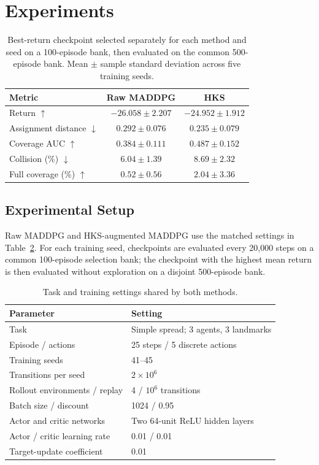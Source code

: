 \documentclass{article}
\begin{document}
\section{Experiments}
\begin{table}[t]
\centering
\caption{Best-return checkpoint selected separately for each method and seed on a 100-episode bank, then evaluated on the common 500-episode bank. Mean $\pm$ sample standard deviation across five training seeds.}
\label{tab:results}
\small\setlength{\tabcolsep}{4pt}
\begin{tabular}{lcc}
\toprule
Metric & Raw MADDPG & HKS \\
\midrule
Return $\uparrow$ & $-26.058 \pm 2.207$ & $-24.952 \pm 1.912$ \\
Assignment distance $\downarrow$ & $0.292 \pm 0.076$ & $0.235 \pm 0.079$ \\
Coverage AUC $\uparrow$ & $0.384 \pm 0.111$ & $0.487 \pm 0.152$ \\
Collision (\%) $\downarrow$ & $6.04 \pm 1.39$ & $8.69 \pm 2.32$ \\
Full coverage (\%) $\uparrow$ & $0.52 \pm 0.56$ & $2.04 \pm 3.36$ \\
\bottomrule
\end{tabular}
\end{table}
\subsection{Experimental Setup}
Raw MADDPG and HKS-augmented MADDPG use the matched settings in Table~\ref{tab:setup}. For each training seed, checkpoints are evaluated every 20,000 steps on a common 100-episode selection bank; the checkpoint with the highest mean return is then evaluated without exploration on a disjoint 500-episode bank.

\begin{table}[t]
\centering
\caption{Task and training settings shared by both methods.}
\label{tab:setup}
\footnotesize\setlength{\tabcolsep}{4pt}
\begin{tabular}{ll}
\toprule
Parameter & Setting \\
\midrule
Task & Simple spread; 3 agents, 3 landmarks \\
Episode / actions & 25 steps / 5 discrete actions \\
Training seeds & 41--45 \\
Transitions per seed & $2\times10^6$ \\
Rollout environments / replay & 4 / $10^6$ transitions \\
Batch size / discount & 1024 / 0.95 \\
Actor and critic networks & Two 64-unit ReLU hidden layers \\
Actor / critic learning rate & 0.01 / 0.01 \\
Target-update coefficient & 0.01 \\
\bottomrule
\end{tabular}
\end{table}
\end{document}
